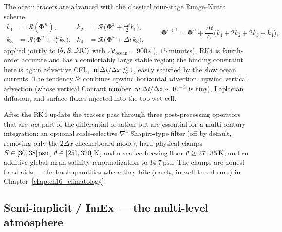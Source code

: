 The ocean tracers are advanced with the classical four-stage Runge--Kutta scheme,
\begin{equation}
\begin{aligned}
  k_1 &= \mathcal{R}(\boldsymbol\Phi^n), &
  k_2 &= \mathcal{R}\!\big(\boldsymbol\Phi^n+\tfrac{\Delta t}{2}k_1\big), \\
  k_3 &= \mathcal{R}\!\big(\boldsymbol\Phi^n+\tfrac{\Delta t}{2}k_2\big), &
  k_4 &= \mathcal{R}\!\big(\boldsymbol\Phi^n+\Delta t\,k_3\big),
\end{aligned}
\qquad
  \boldsymbol\Phi^{n+1}=\boldsymbol\Phi^n+\frac{\Delta t}{6}\big(k_1+2k_2+2k_3+k_4\big),
  \label{eq:rk4}
\end{equation}
applied jointly to $(\theta,S,\text{DIC})$ with $\Delta t_{\mathrm{ocean}}=900\,\mathrm{s}$
(, $15$ minutes). RK4 is fourth-order accurate and has a comfortably large stable
region; the binding constraint here is again advective CFL, $|\mathbf{u}|\Delta t/\Delta x\lesssim 1$,
easily satisfied by the slow ocean currents. The tendency $\mathcal{R}$ combines upwind horizontal
advection, upwind vertical advection (whose vertical Courant number $|w|\Delta t/\Delta z\sim
10^{-3}$ is tiny), Laplacian diffusion, and surface fluxes injected into the top wet cell.


After the RK4 update the tracers pass through three post-processing operators that are \emph{not}
part of the differential equation but are essential for a multi-century integration: an optional
scale-selective $\nabla^4$ Shapiro-type filter (off by default, removing only the $2\Delta x$
checkerboard mode); hard physical clamps $S\in[30,38]\,\mathrm{psu}$, $\theta\in[250,320]\,
\mathrm{K}$, and a sea-ice freezing floor $\theta\ge 271.35\,\mathrm{K}$; and an additive
global-mean salinity renormalization to $34.7\,\mathrm{psu}$. The clamps are honest band-aids ---
the book quantifies where they bite (rarely, in well-tuned runs) in Chapter~\ref{chap:ch16_climatology}.

\subsection{Semi-implicit / ImEx --- the multi-level atmosphere}

